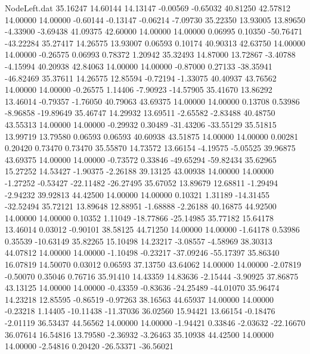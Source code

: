 \begin{filecontents}{NodeLeft.dat}
  35.16247   14.60144   14.13147    -0.00569   -0.65032   40.81250   42.57812   14.00000   14.00000   -0.60144   -0.13147   -0.06214   -7.09730
  35.22350   13.93005   13.89650    -4.33900   -3.69438   41.09375   42.60000   14.00000   14.00000    0.06995    0.10350  -50.76471  -43.22284
  35.27417   14.26575   13.93007     0.06593    0.10174   40.90313   42.63750   14.00000   14.00000   -0.26575    0.06993    0.78372    1.20942
  35.32493   14.87000   13.72867    -3.40788   -4.15994   40.20938   42.84063   14.00000   14.00000   -0.87000    0.27133  -38.35941  -46.82469
  35.37611   14.26575   12.85594    -0.72194   -1.33075   40.40937   43.76562   14.00000   14.00000   -0.26575    1.14406   -7.90923  -14.57905
  35.41670   13.86292   13.46014    -0.79357   -1.76050   40.79063   43.69375   14.00000   14.00000    0.13708    0.53986   -8.96858  -19.89649
  35.46747   14.29932   13.69511    -2.65582   -2.83488   40.48750   43.55313   14.00000   14.00000   -0.29932    0.30489  -31.43206  -33.55129
  35.51815   13.99719   13.79580     0.06593    0.06593   40.60938   43.51875   14.00000   14.00000    0.00281    0.20420    0.73470    0.73470
  35.55870   14.73572   13.66154    -4.19575   -5.05525   39.96875   43.69375   14.00000   14.00000   -0.73572    0.33846  -49.65294  -59.82434
  35.62965   15.27252   14.53427    -1.90375   -2.26188   39.13125   43.00938   14.00000   14.00000   -1.27252   -0.53427  -22.11482  -26.27495
  35.67052   13.89679   12.68811    -1.29494   -2.94232   39.92813   44.42500   14.00000   14.00000    0.10321    1.31189  -14.31455  -32.52494
  35.72121   13.89648   12.88951    -1.68888   -2.26188   40.16875   44.92500   14.00000   14.00000    0.10352    1.11049  -18.77866  -25.14985
  35.77182   15.64178   13.46014     0.03012   -0.90101   38.58125   44.71250   14.00000   14.00000   -1.64178    0.53986    0.35539  -10.63149
  35.82265   15.10498   14.23217    -3.08557   -4.58969   38.30313   44.07812   14.00000   14.00000   -1.10498   -0.23217  -37.09246  -55.17397
  35.86340   16.07819   14.50070     0.03012    0.06593   37.13750   43.64062   14.00000   14.00000   -2.07819   -0.50070    0.35046    0.76716
  35.91410   14.43359   14.83636    -2.15444   -3.90925   37.86875   43.13125   14.00000   14.00000   -0.43359   -0.83636  -24.25489  -44.01070
  35.96474   14.23218   12.85595    -0.86519   -0.97263   38.16563   44.65937   14.00000   14.00000   -0.23218    1.14405  -10.11438  -11.37036
  36.02560   15.94421   13.66154    -0.18476   -2.01119   36.53437   44.56562   14.00000   14.00000   -1.94421    0.33846   -2.03632  -22.16670
  36.07614   16.54816   13.79580    -2.36932   -3.26463   35.10938   44.42500   14.00000   14.00000   -2.54816    0.20420  -26.53371  -36.56021

\end{filecontents}

